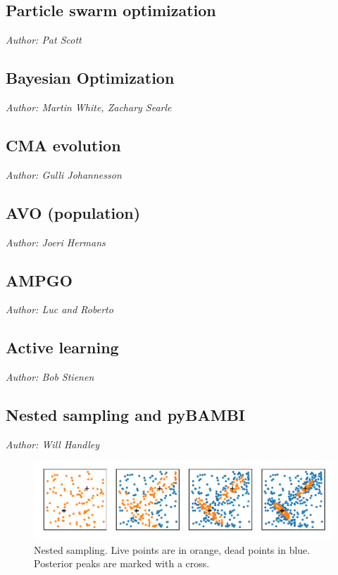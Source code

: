 \documentclass[11pt]{article}
\begin{document}
\subsection{Particle swarm optimization}
\emph{Author: Pat Scott}

\subsection{Bayesian Optimization}

\emph{Author: Martin White, Zachary Searle}

\subsection{CMA evolution}
\emph{Author: Gulli Johannesson}

\subsection{AVO (population)}
\emph{Author: Joeri Hermans}

\subsection{AMPGO}
\emph{Author: Luc and Roberto} 

\subsection{Active learning}
\emph{Author: Bob Stienen}

\subsection{Nested sampling and pyBAMBI}

\emph{Author: Will Handley}
\begin{figure}
    \centerline{%
        \includegraphics{nested_sampling.pdf}
    }
    \caption{Nested sampling. Live points are in orange, dead points in blue. Posterior peaks are marked with a cross.}
\end{figure}
\end{document}
